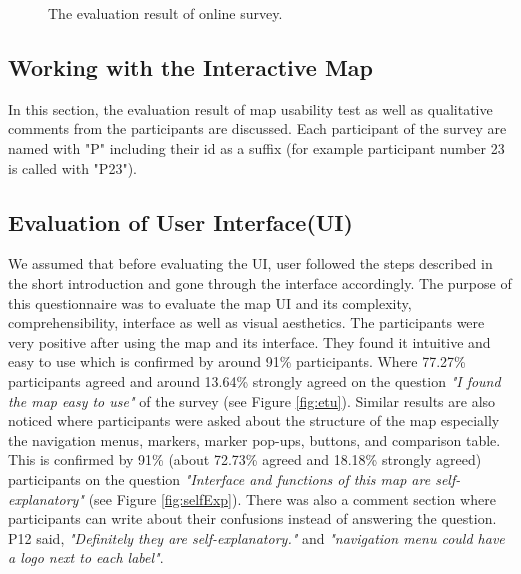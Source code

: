 \begin{figure} [h]
  \begin{center}
\hfill
{}
\hfill
\caption{The evaluation result of online survey.}
\label{fig:self-Exp}
\end{center}
\end{figure}

\subsection{Working with the Interactive Map}

In this section, the evaluation result of map usability test as well as qualitative comments from the participants are discussed. Each participant of the survey are named with "P" including their id as a suffix (for example participant number 23 is called with "P23"). 

\subsection*{Evaluation of User Interface(UI)}

We assumed that before evaluating the UI, user followed the steps described in the short introduction and gone through the interface accordingly. The purpose of this questionnaire was to evaluate the map UI and its complexity, comprehensibility, interface as well as visual aesthetics. The participants were very positive after using the map and its interface. They found it intuitive and easy to use which is confirmed by around 91\% participants. Where 77.27\% participants agreed and around 13.64\% strongly agreed on the question \textit{"I found the map easy to use"} of the survey (see Figure \ref{fig:etu}). Similar results are also noticed where participants were asked about the structure of the map especially the navigation menus, markers, marker pop-ups, buttons, and comparison table. This is confirmed by 91\% (about 72.73\% agreed and 18.18\% strongly agreed) participants on the question \textit{"Interface and functions of this map are self-explanatory"} (see Figure \ref{fig:selfExp}). There was also a comment section where participants can write about their confusions instead of answering the question. P12 said, \textit{"Definitely they are self-explanatory."} and \textit{"navigation menu could have a logo next to each label"}. 



